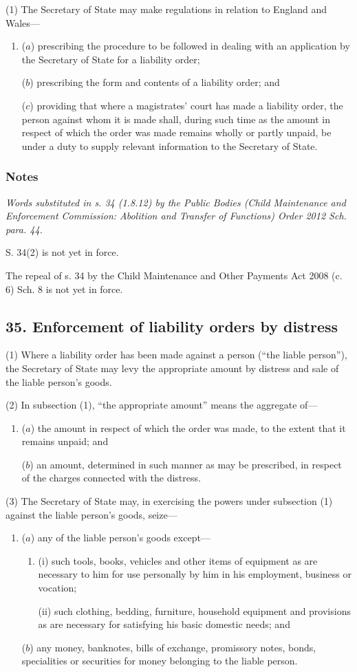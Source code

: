 \documentclass[a4paper]{article}
\newcommand\amendment[1]{\subsubsection*{Notes}{\itshape\frenchspacing\footnotesize #1 \par}}
\begin{document}
(1) The Secretary of State may make regulations in relation to England and Wales---
\begin{enumerate}\item[]
($a$)
prescribing the procedure to be followed in dealing with an application by the Secretary of State for a liability order;

($b$)
prescribing the form and contents of a liability order; and

($c$)
providing that where a magistrates’ court has made a liability order, the person against whom it is made shall, during such time as the amount in respect of which the order was made remains wholly or partly unpaid, be under a duty to supply relevant information to the Secretary of State.
\end{enumerate}

\amendment{
Words substituted in s. 34 (1.8.12) by the Public Bodies (Child Maintenance and Enforcement Commission: Abolition and Transfer of Functions) Order 2012 Sch. para. 44.

S. 34(2) is not yet in force.

The repeal of s. 34 by the Child Maintenance and Other Payments Act 2008 (c. 6) Sch. 8 is not yet in force.
}

\subsection{35. Enforcement of liability orders by distress}

(1) Where a liability order has been made against a person (“the liable person”), the Secretary of State may levy the appropriate amount by distress and sale of the liable person’s goods.

(2) In subsection (1), “the appropriate amount” means the aggregate of---
\begin{enumerate}\item[]
($a$)
the amount in respect of which the order was made, to the extent that it remains unpaid; and

($b$)
an amount, determined in such manner as may be prescribed, in respect of the charges connected with the distress.
\end{enumerate}

(3) The Secretary of State may, in exercising the powers under subsection (1) against the liable person’s goods, seize---
\begin{enumerate}\item[]
($a$)
any of the liable person’s goods except---
\begin{enumerate}\item[]
(i) such tools, books, vehicles and other items of equipment as are necessary to him for use personally by him in his employment, business or vocation;

(ii) such clothing, bedding, furniture, household equipment and provisions as are necessary for satisfying his basic domestic needs; and
\end{enumerate}
($b$)
any money, banknotes, bills of exchange, promissory notes, bonds, specialities or securities for money belonging to the liable person.
\end{enumerate}
\end{document}
